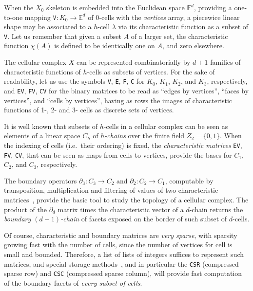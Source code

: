 \documentclass[]{egpubl}
\def\E{\mathbb{E}}
\begin{document}
When the $X_0$ skeleton is embedded into the Euclidean space $\E^d$, providing a one-to-one mapping $\texttt{V}: K_0 \to \E^d$ of 0-cells with the \emph{vertices} array, a piecewice linear shape may be associated to a $h$-cell $\lambda$ via its characteristic function  as a subset of \texttt{V}. Let us remember that given a subset $A$ of a larger set, the characteristic function $\chi(A)$ is defined to be identically one on $A$, and zero elsewhere. 

The cellular complex $X$ can be represented combinatorially  by $d+1$ families of characteristic functions of $h$-cells as subsets of vertices. For the sake of readability, let us use the symbols  \texttt{V}, \texttt{E}, \texttt{F}, \texttt{C} for $K_0$, $K_1$, $K_2$, and $K_3$, respectively, and \texttt{EV}, \texttt{FV}, \texttt{CV} for the binary matrices to be read as ``edges by vertices'', ``faces by vertices'', and ``cells by vertices'', having as rows the images of characteristic functions of 1-, 2- and 3- cells as discrete sets of vertices.

It is well known that subsets of $h$-cells in a cellular complex can be seen as elements of a linear space $C_h$ of \emph{$h$-chains} over the finite field $Z_2 = \{0,1\}$. When the indexing of cells (i.e.~their ordering) is fixed, the \emph{characteristic matrices} \texttt{EV}, \texttt{FV}, \texttt{CV}, that can be seen as maps from cells to vertices, provide the bases for $C_1$, $C_2$, and $C_3$, respectively. 

The boundary operators $\partial_3: C_3 \to C_2$ and $\partial_2: C_2 \to C_1$, computable by transposition, multiplication and filtering of values of two characteristic matrices~\cite{Dicarlo:2014:TNL:2543138.2543294}, provide the basic tool to study the topology of a cellular complex. The product of the $\partial_d$ matrix  times the characteristic vector of a $d$-chain returns the \emph{boundary $(d-1)$-chain} of facets exposed on the border of such subset of $d$-cells.   

Of course, characteristic and boundary matrices are \emph{very sparse}, with sparsity growing fast with the number of cells, since the number of vertices for cell is small and bounded. Therefore, a list of lists of integers suffices to represent such matrices, and special storage methods~\cite{gemmexp}, and in particular the \texttt{CSR} (compressed sparse row)  and \texttt{CSC} (compressed sparse column), will provide fast computation of the boundary facets of \emph{every subset of cells}.
\end{document}
